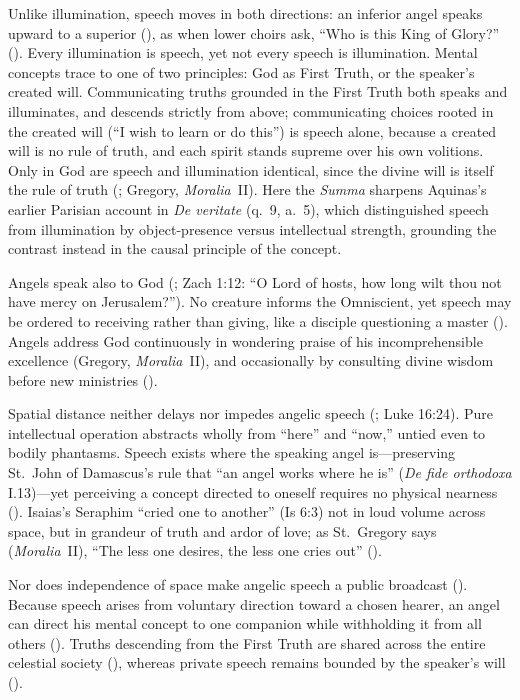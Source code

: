 Unlike illumination, speech moves in both directions: an inferior angel speaks upward to a superior (), as when lower choirs ask, ``Who is this King of Glory?'' (). Every illumination is speech, yet not every speech is illumination. Mental concepts trace to one of two principles: God as First Truth, or the speaker's created will. Communicating truths grounded in the First Truth both speaks and illuminates, and descends strictly from above; communicating choices rooted in the created will (``I wish to learn or do this'') is speech alone, because a created will is no rule of truth, and each spirit stands supreme over his own volitions. Only in God are speech and illumination identical, since the divine will is itself the rule of truth (; Gregory, \emph{Moralia}~II). Here the \emph{Summa} sharpens Aquinas's earlier Parisian account in \emph{De veritate} (q.~9, a.~5), which distinguished speech from illumination by object-presence versus intellectual strength, grounding the contrast instead in the causal principle of the concept.

Angels speak also to God (; Zach 1:12: ``O Lord of hosts, how long wilt thou not have mercy on Jerusalem?''). No creature informs the Omniscient, yet speech may be ordered to receiving rather than giving, like a disciple questioning a master (). Angels address God continuously in wondering praise of his incomprehensible excellence (Gregory, \emph{Moralia}~II), and occasionally by consulting divine wisdom before new ministries ().

Spatial distance neither delays nor impedes angelic speech (; Luke 16:24). Pure intellectual operation abstracts wholly from ``here'' and ``now,'' untied even to bodily phantasms. Speech exists where the speaking angel is---preserving St.~John of Damascus's rule that ``an angel works where he is'' (\emph{De fide orthodoxa} I.13)---yet perceiving a concept directed to oneself requires no physical nearness (). Isaias's Seraphim ``cried one to another'' (Is 6:3) not in loud volume across space, but in grandeur of truth and ardor of love; as St.~Gregory says (\emph{Moralia}~II), ``The less one desires, the less one cries out'' ().

Nor does independence of space make angelic speech a public broadcast (). Because speech arises from voluntary direction toward a chosen hearer, an angel can direct his mental concept to one companion while withholding it from all others (). Truths descending from the First Truth are shared across the entire celestial society (), whereas private speech remains bounded by the speaker's will ().

